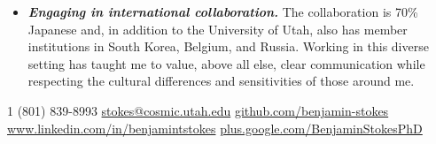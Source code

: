 \documentclass[10pt,letterpaper]{article} %
\begin{document}
{{{\begin{itemize}
       observatory is operational 24 hours per day, 365 days
      per year.  With operational costs and capital outlays exceeding
      \$100,000 per month, it is imperative that any problems be
      addressed promptly. As a mid-level collaboration member, I have
      developed the skills to rapidly troubleshoot a broad array of
      hardware and software problems.
    \item \textit{\textbf{Engaging in international collaboration.}}
      The  collaboration is 70\% Japanese and, in addition to
      the University of Utah, also has member institutions in South
      Korea, Belgium, and Russia.  Working in this diverse setting has
      taught me to value, above all else, clear communication while
      respecting the cultural differences and sensitivities of those
      around me.
\end{itemize}}}}

\newpage



\noindent\textsmaller{+}1 (801) 839-8993\bull
\href{mailto:stokes@cosmic.utah.edu}{stokes@cosmic.utah.edu}\bull
\href{https://github.com/benjamin-stokes}
{github.com/benjamin-stokes}\\
\href{http://www.linkedin.com/in/benjamintstokes}
{www.linkedin.com/in/benjamintstokes}\bull
\href{https://plus.google.com/+BenjaminStokesPhD}
{plus.google.com/\textsmaller{+}BenjaminStokesPhD}

\spacedhrule{0.9em}{-0.2em}


\end{document}
